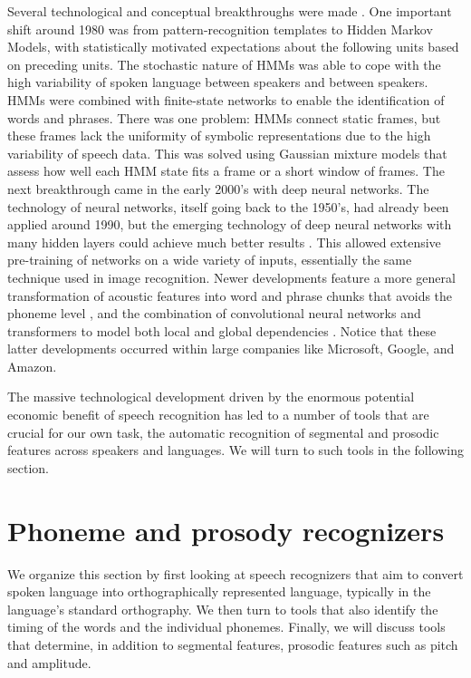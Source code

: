 Several technological and conceptual breakthroughs were made \cite{juang2005}. One important shift around 1980 was from pattern-recognition templates to Hidden Markov Models, with statistically motivated expectations about the following units based on preceding units. The stochastic nature of HMMs was able to cope with the high variability of spoken language between speakers and between speakers. HMMs were combined with finite-state networks to enable the identification of words and phrases. There was one problem: HMMs connect static frames, but these frames lack the uniformity of symbolic representations due to the high variability of speech data. This was solved using Gaussian mixture models that assess how well each HMM state fits a frame or a short window of frames. The next breakthrough came in the early 2000's with deep neural networks. The technology of neural networks, itself going back to the 1950's, had already been applied around 1990, but the emerging technology of deep neural networks with many hidden layers could achieve much better results \cite{hinton2012}. This allowed extensive pre-training of networks on a wide variety of inputs, essentially the same technique used in image recognition. Newer developments feature a more general transformation of acoustic features into word and phrase chunks that avoids the phoneme level \cite{chan2015}, and the combination of convolutional neural networks and transformers to model both local and global dependencies \cite{gulati2020}. Notice that these latter developments occurred within large companies like Microsoft, Google, and Amazon.

The massive technological development driven by the enormous potential economic benefit of speech recognition has led to a number of tools that are crucial for our own task, the automatic recognition of segmental and prosodic features across speakers and languages. We will turn to such tools in the following section.

\section{Phoneme and prosody recognizers}

We organize this section by first looking at speech recognizers that aim to convert spoken language into orthographically represented language, typically in the language's standard orthography. We then turn to tools that also identify the timing of the words and the individual phonemes. Finally, we will discuss tools that determine, in addition to segmental features, prosodic features such as pitch and amplitude.

